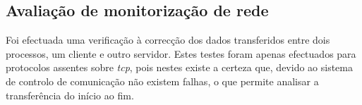 %
%
%

\subsection{Avaliação de monitorização de rede}

Foi efectuada uma verificação à correcção dos dados transferidos entre dois processos, um cliente e outro servidor.
Estes testes foram apenas efectuados para protocolos assentes sobre \textit{tcp}, pois nestes existe a certeza que, devido ao sistema de controlo de comunicação não existem falhas, o que permite analisar a transferência do início ao fim.

